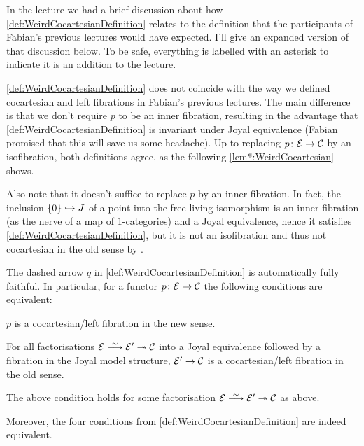 In the lecture we had a brief discussion about how \cref{def:WeirdCocartesianDefinition} relates to the definition that the participants of Fabian's previous lectures would have expected. I'll give an expanded version of that discussion below. To be safe, everything is labelled with an asterisk to indicate it is an addition to the lecture.
\begin{warn*}
	\cref{def:WeirdCocartesianDefinition} does not coincide with the way we defined cocartesian and left fibrations in Fabian's previous lectures. The main difference is that we don't require $p$ to be an inner fibration, resulting in the advantage that \cref{def:WeirdCocartesianDefinition} is invariant under Joyal equivalence (Fabian promised that this will save us some headache). Up to replacing $p\colon \Ee\morphism\Cc$ by an isofibration, both definitions agree, as the following \cref{lem*:WeirdCocartesian} shows.
	
	Also note that it doesn't suffice to replace $p$ by an inner fibration. In fact, the inclusion $\{0\}\monomorphism J$ of a point into the free-living isomorphism is an inner fibration (as the nerve of a map of $1$-categories) and a Joyal equivalence, hence it satisfies \cref{def:WeirdCocartesianDefinition}, but it is not an isofibration and thus not cocartesian in the old sense by \cite[Proposition~IX.2]{HigherCatsII}.
\end{warn*}
\begin{lem*}\label{lem*:WeirdCocartesian}
	The dashed arrow $q$ in \cref{def:WeirdCocartesianDefinition} is automatically fully faithful. In particular, for a functor $p\colon \Ee\morphism\Cc$ the following conditions are equivalent:
	\begin{alphanumerate}
		\item $p$ is a cocartesian/left fibration in the new sense.
		\item For all factorisations $\Ee\isomorphism\Ee'\epimorphism\Cc$ into a Joyal equivalence followed by a fibration in the Joyal model structure, $\Ee'\morphism\Cc$ is a cocartesian/left fibration in the old sense.
		\item The above condition holds for some factorisation $\Ee\isomorphism\Ee'\epimorphism\Cc$ as above.
	\end{alphanumerate}
	Moreover, the four conditions from \cref{def:WeirdCocartesianDefinition} are indeed equivalent.
\end{lem*}
